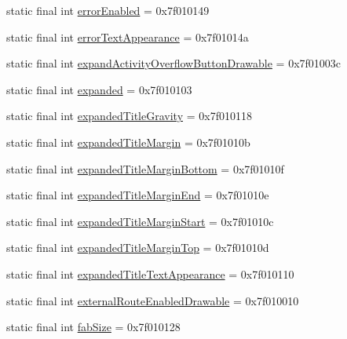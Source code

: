 \begin{CompactItemize}
\item 
static final int \hyperlink{classandroid_1_1support_1_1v7_1_1mediarouter_1_1_r_1_1attr_4020d0a011a9661363697e649b927f51}{errorEnabled} = 0x7f010149
\item 
static final int \hyperlink{classandroid_1_1support_1_1v7_1_1mediarouter_1_1_r_1_1attr_6b3b30af8f9da0b201efcb784e32a8d2}{errorTextAppearance} = 0x7f01014a
\item 
static final int \hyperlink{classandroid_1_1support_1_1v7_1_1mediarouter_1_1_r_1_1attr_a886d2fc65da168783ffc3c75a408821}{expandActivityOverflowButtonDrawable} = 0x7f01003c
\item 
static final int \hyperlink{classandroid_1_1support_1_1v7_1_1mediarouter_1_1_r_1_1attr_48993a8b797057962d8c892ec7b85a73}{expanded} = 0x7f010103
\item 
static final int \hyperlink{classandroid_1_1support_1_1v7_1_1mediarouter_1_1_r_1_1attr_7966e5d63b066cb5673e8b8439cb8dcb}{expandedTitleGravity} = 0x7f010118
\item 
static final int \hyperlink{classandroid_1_1support_1_1v7_1_1mediarouter_1_1_r_1_1attr_c4a23dfe2a64dcd6c98ec0926a0c0994}{expandedTitleMargin} = 0x7f01010b
\item 
static final int \hyperlink{classandroid_1_1support_1_1v7_1_1mediarouter_1_1_r_1_1attr_e212d2ed2da76cc6d8b598b715aa3daa}{expandedTitleMarginBottom} = 0x7f01010f
\item 
static final int \hyperlink{classandroid_1_1support_1_1v7_1_1mediarouter_1_1_r_1_1attr_e8a045c5de622ba801e212d26bd2f61b}{expandedTitleMarginEnd} = 0x7f01010e
\item 
static final int \hyperlink{classandroid_1_1support_1_1v7_1_1mediarouter_1_1_r_1_1attr_b0ff67cc7d8c7bacad0827102a645748}{expandedTitleMarginStart} = 0x7f01010c
\item 
static final int \hyperlink{classandroid_1_1support_1_1v7_1_1mediarouter_1_1_r_1_1attr_7f9330f0244e6c366add8fcf866354d3}{expandedTitleMarginTop} = 0x7f01010d
\item 
static final int \hyperlink{classandroid_1_1support_1_1v7_1_1mediarouter_1_1_r_1_1attr_c430d4812ebfa7bf792f6ce3e7a772d9}{expandedTitleTextAppearance} = 0x7f010110
\item 
static final int \hyperlink{classandroid_1_1support_1_1v7_1_1mediarouter_1_1_r_1_1attr_8a6ee67b17e5dfbd63d517b26507cbe0}{externalRouteEnabledDrawable} = 0x7f010010
\item 
static final int \hyperlink{classandroid_1_1support_1_1v7_1_1mediarouter_1_1_r_1_1attr_e6b835902f55f8030ed414c4e81ceb46}{fabSize} = 0x7f010128

\end{CompactItemize}
